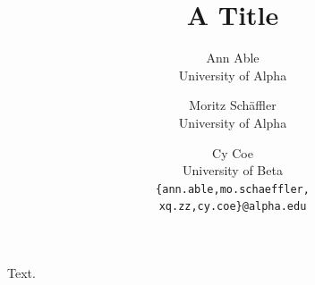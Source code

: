 \documentclass{article}
\title{A Title}
\author{%
  Ann Able \\ University of Alpha \and
  Moritz Schäffler \\ University of Alpha \and
  Cy Coe \\ University of Beta \\
  \texttt{\{ann.able,mo.schaeffler,}\\ \texttt{xq.zz,cy.coe\}@alpha.edu}
}
\begin{document}
\maketitle
Text.
\end{document}
